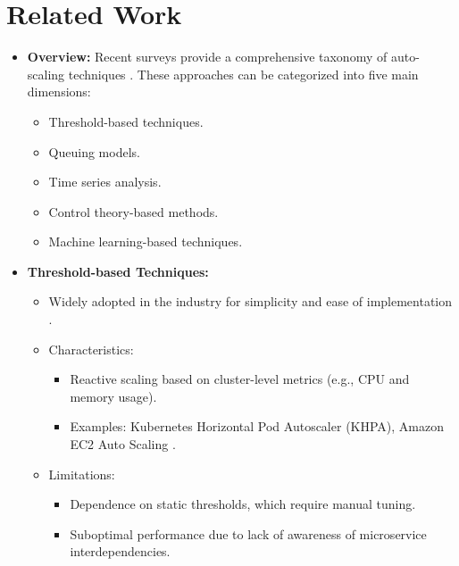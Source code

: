 \documentclass[conference]{IEEEtran}
\begin{document}
\section{Related Work}
\label{sec:related_work}
\begin{itemize}
    \item \textbf{Overview:} 
    Recent surveys provide a comprehensive taxonomy of auto-scaling techniques \cite{qu2018autoscaling, santos2021towards}. These approaches can be categorized into five main dimensions:
    \begin{itemize}
        \item Threshold-based techniques.
        \item Queuing models.
        \item Time series analysis.
        \item Control theory-based methods.
        \item Machine learning-based techniques.
    \end{itemize}
    
    \item \textbf{Threshold-based Techniques:}
    \begin{itemize}
        \item Widely adopted in the industry for simplicity and ease of implementation \cite{aws2021autoscaling, kubernetesHPA}.
        \item Characteristics:
        \begin{itemize}
            \item Reactive scaling based on cluster-level metrics (e.g., CPU and memory usage).
            \item Examples: Kubernetes Horizontal Pod Autoscaler (KHPA), Amazon EC2 Auto Scaling \cite{aws2021autoscaling}.
        \end{itemize}
        \item Limitations:
        \begin{itemize}
            \item Dependence on static thresholds, which require manual tuning.
            \item Suboptimal performance due to lack of awareness of microservice interdependencies.
        \end{itemize}
    \end{itemize}


\end{itemize}
\end{document}
